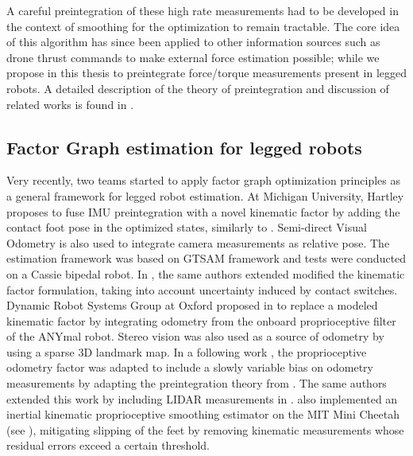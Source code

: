 A careful preintegration \cite{lupton-09,forster2017-TRO} of these high 
rate measurements had to be developed in the context of smoothing for the optimization to remain tractable. The core idea of this algorithm has 
since been applied to other information sources such as drone thrust commands \cite{nisar2019vimo} to make external force estimation possible; 
while we propose in this thesis to preintegrate force/torque measurements present in legged robots.
A detailed description of the theory of preintegration and discussion of related works is found in .


\subsection{Factor Graph estimation for legged robots}
Very recently, two teams started to apply factor graph optimization principles as a general framework for legged robot estimation. At Michigan University, Hartley \cite{hartley2018legged} 
proposes to fuse IMU preintegration with a novel kinematic factor by adding the contact foot pose in the optimized states, similarly to \cite{bloesch2013state,rotella2014state}. 
Semi-direct Visual Odometry \cite{forster2014svo} is also used to integrate camera measurements as relative pose. The estimation framework was based on GTSAM framework \cite{dellaert2012factor}
and tests were conducted on a Cassie bipedal robot. In \cite{hartley2018hybrid}, the same authors extended 
modified the kinematic factor formulation, taking into account uncertainty induced by contact switches. Dynamic Robot Systems Group at Oxford proposed in 
\cite{wisth2019robust} to replace a modeled kinematic factor by integrating odometry from the onboard proprioceptive filter of the ANYmal robot. Stereo vision was 
also used as a source of odometry by using a sparse 3D landmark map. In a following work \cite{wisth2020preintegrated}, the proprioceptive odometry factor was adapted
to include a slowly variable bias on odometry measurements by adapting the preintegration theory from \cite{forster2017-TRO}. The same authors extended this work
by including LIDAR measurements in \cite{wisth2021vilens}.
\cite{kim2021legged} also implemented an inertial kinematic proprioceptive smoothing estimator on the MIT Mini Cheetah (see ), mitigating slipping of the feet by removing kinematic 
measurements whose residual errors exceed a certain threshold.    


